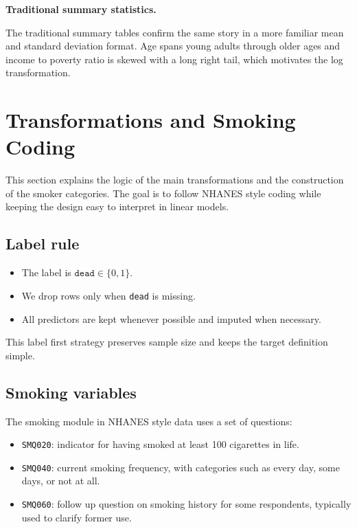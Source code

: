 \documentclass{article}
\begin{document}
\medskip
\noindent\textbf{Traditional summary statistics.}
\par

\medskip
\par


The traditional summary tables confirm the same story in a more familiar mean and standard deviation format. Age spans young adults through older ages and income to poverty ratio is skewed with a long right tail, which motivates the log transformation.

\section{Transformations and Smoking Coding}

This section explains the logic of the main transformations and the construction of the smoker categories. The goal is to follow NHANES style coding while keeping the design easy to interpret in linear models.

\subsection*{Label rule}

\begin{itemize}
  \item The label is \(\texttt{dead}\in\{0,1\}\).
  \item We drop rows only when \texttt{dead} is missing.
  \item All predictors are kept whenever possible and imputed when necessary.
\end{itemize}

This label first strategy preserves sample size and keeps the target definition simple.

\subsection*{Smoking variables}

The smoking module in NHANES style data uses a set of questions:

\begin{itemize}
  \item \texttt{SMQ020}: indicator for having smoked at least 100 cigarettes in life.
  \item \texttt{SMQ040}: current smoking frequency, with categories such as every day, some days, or not at all.
  \item \texttt{SMQ060}: follow up question on smoking history for some respondents, typically used to clarify former use.
\end{itemize}
\end{document}
